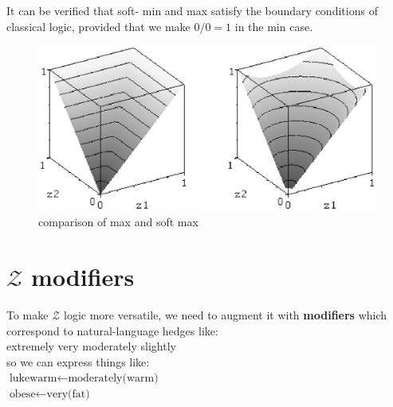It can be verified that soft- min and max satisfy the boundary conditions of classical logic, provided that we make $0/0 = 1$ in the min case.

\begin{figure}[H]
\centering
\includegraphics[scale=0.9]{soft-max.eps}
\caption{comparison of max and soft max}
\end{figure}

\section{$\mathcal{Z}$ modifiers}

To make $\mathcal{Z}$ logic more versatile, we need to augment it with \textbf{modifiers} which correspond to natural-language hedges like:\\
\hspace*{1cm} extremely \hspace*{1cm} very \hspace*{1cm} moderately \hspace*{1cm} slightly\\
so we can express things like:\\
\hspace*{1cm} $\mbox{lukewarm} \leftarrow \mbox{moderately(warm)}$\\
\hspace*{1cm} $\mbox{obese} \leftarrow \mbox{very(fat)}$

